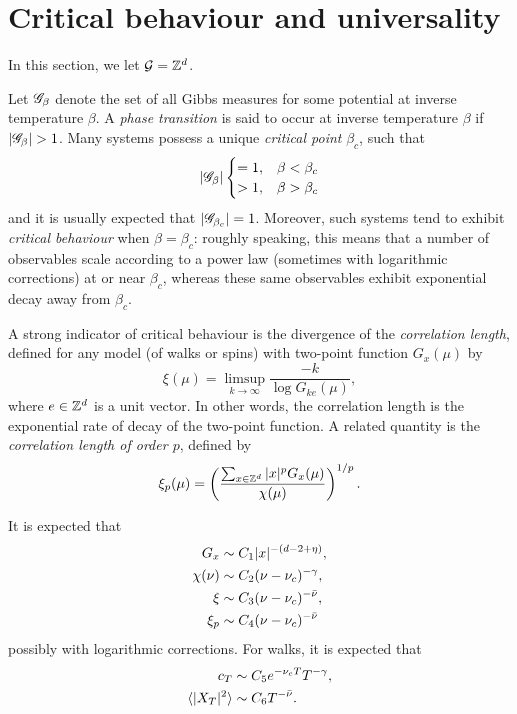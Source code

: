 
\section{Critical behaviour and universality}


In this section, we let $\mathcal{G} = { {{\mathbb Z}}^d }$.

Let $\mathscr{G}_\beta$ denote the set of all Gibbs measures for some potential at inverse temperature
$\beta$. A \emph{phase transition} is said to occur at inverse temperature $\beta$ if
$|\mathscr{G}_\beta| > 1$. Many systems possess a unique \emph{critical point} $\beta_c$, such that
\begin{equation}
|\mathscr{G}_\beta|
\begin{cases}
=1,  & \beta < \beta_c \\
> 1, & \beta > \beta_c
\end{cases}
\end{equation}
and it is usually expected that $|\mathscr{G}_{\beta_c}| = 1$.
Moreover, such systems tend to exhibit \emph{critical behaviour} when $\beta = \beta_c$:
roughly speaking, this means that a number of observables scale according to a power
law (sometimes with logarithmic corrections) at or near $\beta_c$, whereas these same
observables exhibit exponential decay away from $\beta_c$.

A strong indicator of critical behaviour is the divergence of the
\emph{correlation length}, defined for any model (of walks or spins) with two-point
function $G_x(\mu)$ by
\begin{equation}
\xi(\mu) = \limsup_{k\to\infty} \frac{-k}{\log G_{ke}(\mu)},
\end{equation}
where $e \in { {{\mathbb Z}}^d }$ is a unit vector.
In other words, the correlation length is the exponential rate of decay of the
two-point function.
A related quantity is the \emph{correlation length of order $p$}, defined by
\begin{equation}
\xi_p(\mu) = \left(\frac{\sum_{x\in{ {{\mathbb Z}}^d }} |x|^p G_x(\mu)}{\chi(\mu)}\right)^{1/p}.
\end{equation}

It is expected that
\begin{align}
G_x       &\sim C_1 |x|^{-(d - 2 + \eta)}, \\
\chi(\nu) &\sim C_2 (\nu - \nu_c)^{-\gamma}, \\
\xi       &\sim C_3 (\nu - \nu_c)^{-\bar\nu}, \\
\xi_p     &\sim C_4 (\nu - \nu_c)^{-\bar\nu}
\end{align}
possibly with logarithmic corrections.
For walks, it is expected that
\begin{align}
c_T                       &\sim C_5 e^{-\nu_c T} T^{-\gamma}, \\
\langle |X_T|^2 \rangle   &\sim C_6 T^{-\bar\nu}.
\end{align}

